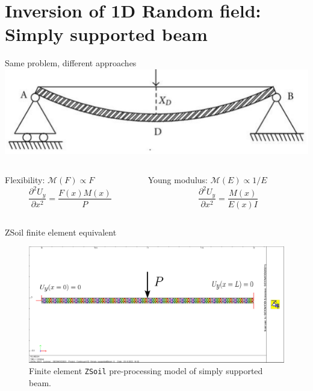 \documentclass[dvipsnames]{beamer}
\newcommand{\ddiff}[2]{\frac{\partial^2 #1}{\partial #2^2}}
\begin{document}
	
	
	\section{Inversion of 1D Random field: Simply supported beam}
	
	\begin{frame}{Same problem, different approaches}
	\includegraphics[width=\textwidth]{simply_supported_beam.png}
	\begin{columns}
	\begin{column}{.5\textwidth}
	\begin{block}{Flexibility: $\mathcal{M}(F) \propto F$}
	\[\ddiff{U_y}{x} = \frac{F(x)M(x)}{P} \]
	\end{block}
	\end{column}
	\begin{column}{.5\textwidth}
	\begin{block}{Young modulus: $\mathcal{M}(E) \propto 1/E$}
	\[\ddiff{U_y}{x} =  \frac{M(x)}{E(x)I}\]
	\end{block}
	\end{column}
	\end{columns}
	\end{frame}
	
	\begin{frame}{ZSoil finite element equivalent}
	\begin{figure}
	\includegraphics[width=\textwidth]{images/zsoil_ssb.pdf}
	\caption{Finite element \texttt{ZSoil} pre-processing model of simply supported beam.}
	\end{figure}
	\end{frame}
	
\end{document}
